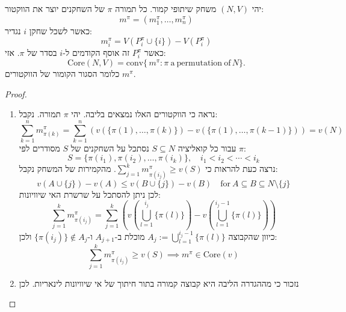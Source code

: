 \documentclass{tstextbook}
\begin{document}
\begin{proposition}
יהי \((N,V)\) משחק שיתופי קמור. כל תמורה \(\pi\) של השחקנים יוצר את הווקטור:
$$m^{\pi}=\left( m_{1}^{\pi},\dots,m_{n}^{\pi} \right)$$
כאשר לשכל שחקן \(i\) נגדיר:
$$m_{i}^{\pi}=V\left( P_{i}^{\pi}\cup \{ i \} \right)-V\left( P_{i}^{\pi} \right)$$
כאשר \(P_{i}^{\pi}\) זה אוסף הקודמים ל-\(i\) בסדר של \(\pi\). אזי:
$$\mathrm{Core}(N,V)=\mathrm{conv}\{\,m^{\pi}:\pi\mathrm{~a~permutation~of}\,N\}.$$
כלומר הסגור הקומור של הווקטורים \(m^{\pi}\).

\end{proposition}
\begin{proof}
  \begin{enumerate}
    \item נראה כי הווקטורים האלו נמצאים בליבה. יהי \(\pi\) תמורה. נקבל: 
$$\sum_{k=1}^{n}m_{\pi(k)}^{\pi}=\sum_{k=1}^{n}\left(v(\{\pi(1),\ldots,\pi(k)\})-v(\{\pi(1),\ldots,\pi(k-1)\})\right)=v(N)$$
עבור כל קואליציה \(S\subseteq N\) נסתכל על השחקנים של \(S\) מסודרים לפי \(\pi\):
$$S=\{\pi(i_{1}),\pi(i_{2}),\ldots,\pi(i_{k})\},\quad i_{1}<i_{2}<\cdots<i_{k}$$
נרצה כעת להראות כי \(\sum_{j=1}^{k}m_{\pi(i_{j})}^{\pi}\geq v(S)\). מהקמירות של המשחק נקבל:
$$v(A\cup\{j\})-v(A)\leq v(B\cup\{j\})-v(B)\quad\mathrm{for~}A\subseteq B\subseteq N\setminus\{j\}$$
לכן ניתן להסתכל על שרשרת האי שיוויונות:
$$\sum_{j=1}^{k}m_{\pi(i_{j})}^{\pi}=\sum_{j=1}^{k}\left(v\left(\bigcup_{l=1}^{i_{j}}\{\pi(l)\}\right)-v\left(\bigcup_{l=1}^{i_{j}-1}\{\pi(l)\}\right)\right)$$
כיוון שהקבוצה \(A_{j}:=\bigcup_{l=1}^{i_{j}-1}\{\pi(l)\}\) מוכלת ב-\(A_{j+1}\) ו-\(\{\pi(i_{j})\}\notin A_{j}\) ולכן:
$$\sum_{j=1}^{k}m_{\pi(i_{j})}^{\pi}\geq v(S)\implies m^{\pi}\in \mathrm{Core}(v)$$


    \item נזכור כי מההגדרה הליבה היא קבוצה קמורה בתור חיתוך של אי שיוויונות לינאריות. לכן  


  \end{enumerate}
\end{proof}
\end{document}
